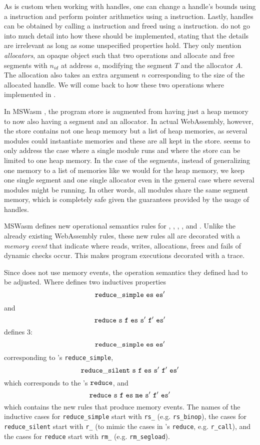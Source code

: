 \documentclass[a4paper]{article}
\begin{document}
As is custom when working with handles, one can change a handle's bounds using a \xxWslice instruction and perform pointer arithmetics using a \xxWhandleadd instruction. Lastly, handles can be obtained by calling a \xxWsegalloc instruction and freed using a \xxWsegfree instruction. \citet{mswasm} do not go into much detail into how these should be implemented, stating that the details are irrelevant as long as some unspecified properties hold. They only mention \emph{allocators}, an opaque object such that two operations  and  allocate and free segments with \xxWid \( n_{id} \) at address \( a \), modifying the segment \( T \) and the allocator \( A \). The allocation also takes an extra argument \( n \) corresponding to the size of the allocated handle. We will come back to how these two operations where implemented in \irismswasm.

In MSWasm \cite{mswasm}, the program store is augmented from having just a heap memory to now also having a segment and an allocator. In actual WebAssembly, however, the store contains not one heap memory but a list of heap memories, as several modules could instantiate memories and these are all kept in the store. \citet{mswasm} seems to only address the case where a single module runs and where the store can be limited to one heap memory. In the case of the segments, instead of generalizing one memory to a list of memories like we would for the heap memory, we keep one single segment and one single allocator even in the general case where several modules might be running. In other words, all modules share the same segment memory, which is completely safe given the guarantees provided by the usage of handles.


MSWasm defines new operational semantics rules for \xxWsegload, \xxWsegstore, \xxWslice, \xxWhandleadd, \xxWsegalloc and \xxWsegfree. Unlike the already existing WebAssembly rules, these new rules all are decorated with a \emph{memory event} that indicate where reads, writes, allocations, frees and fails of dynamic checks occur. This makes program executions decorated with a trace.



Since \iriswasm \cite{iriswasm} does not use memory events, the operation semantics they defined had to be adjusted. Where \iriswasm defines two inductives properties \[ \tt reduce\_simple~es~es' \] and \[ \tt reduce~s~f~es~s'~f'~es' \] \irismswasm defines 3: \[ \tt reduce\_simple~es~es' \] corresponding to \iriswasm's {\tt reduce\_simple}, \[ \tt reduce\_silent~s~f~es~s'~f'~es' \] which corresponds to the \iriswasm's \( \tt reduce \), and \[ \tt reduce~s~f~es~me~s'~f'~es' \] which contains the new rules that produce memory events. The names of the inductive cases for {\tt reduce\_simple} start with {\tt rs\_} (e.g. {\tt rs\_binop}), the cases for {\tt reduce\_silent} start with {\tt r\_} (to mimic the cases in \iriswasm's {\tt reduce}, e.g. {\tt r\_call}), and the cases for {\tt reduce} start with {\tt rm\_} (e.g. {\tt rm\_segload}).
\end{document}
